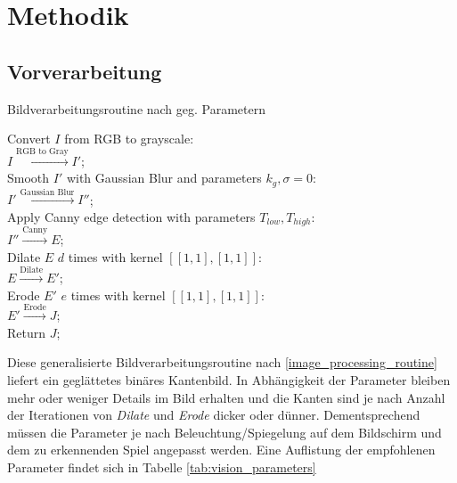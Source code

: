 \section{Methodik}


\subsection{Vorverarbeitung}
\begin{algorithm}[!htbp]
    \LinesNumbered
    \SetAlgoLined
    \caption{Bildverarbeitungsroutine nach geg. Parametern}\label{image_processing_routine}
    Convert $I$ from RGB to grayscale:\\
    $I \xrightarrow{\text{RGB to Gray}} I'$;\\
    Smooth $I'$ with Gaussian Blur and parameters $k_g, \sigma = 0$:\\
    $I' \xrightarrow{\text{Gaussian Blur}} I''$;\\
    Apply Canny edge detection with parameters $T_{low}, T_{high}$:\\
    $I'' \xrightarrow{\text{Canny}} E$;\\
    Dilate $E$ $d$ times with kernel $[[1,1],[1,1]]$:\\
    $E \xrightarrow{\text{Dilate}} E'$;\\
    Erode $E'$ $e$ times with kernel $[[1,1], [1,1]]$:\\
    $ E' \xrightarrow{\text{Erode}} J$;\\
    Return $J$;\\
\end{algorithm}

Diese generalisierte Bildverarbeitungsroutine nach \vref{image_processing_routine} liefert ein geglättetes binäres Kantenbild. In Abhängigkeit der Parameter bleiben mehr oder weniger Details im Bild erhalten und die Kanten sind je nach Anzahl der Iterationen von \textit{Dilate} und \textit{Erode} dicker oder dünner. Dementsprechend müssen die Parameter je nach Beleuchtung/Spiegelung auf dem Bildschirm und dem zu erkennenden Spiel angepasst werden. Eine Auflistung der empfohlenen Parameter findet sich in Tabelle \ref{tab:vision_parameters}

